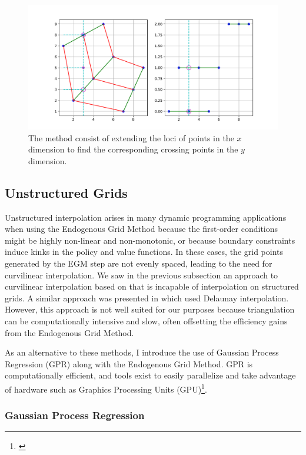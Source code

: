 \documentclass[\econtexRoot/SequentialEGM]{subfiles}
\begin{document}
\begin{figure}
  \centering
  \includegraphics[width=0.8\linewidth]{Figures/Mapping.pdf}
  \caption{The method consist of extending the loci of points in the $x$ dimension to find the corresponding crossing points in the $y$ dimension.}
  \notinsubfile{\label{fig:mapping}}
\end{figure}



\subsection{Unstructured Grids}

Unstructured interpolation arises in many dynamic programming applications when using the Endogenous Grid Method because the first-order conditions might be highly non-linear and non-monotonic, or because boundary constraints induce kinks in the policy and value functions. In these cases, the grid points generated by the EGM step are not evenly spaced, leading to the need for curvilinear interpolation. We saw in the previous subsection an approach to curvilinear interpolation based on \cite{White2015} that is incapable of interpolation on structured grids. A similar approach was presented in \cite{Ludwig2018} which used Delaunay interpolation. However, this approach is not well suited for our purposes because triangulation can be computationally intensive and slow, often offsetting the efficiency gains from the Endogenous Grid Method.

As an alternative to these methods, I introduce the use of Gaussian Process Regression (GPR) along with the Endogenous Grid Method. GPR is computationally efficient, and tools exist to easily parallelize and take advantage of hardware such as Graphics Processing Units (GPU)\footnote{\cite{Gardner2018}}.


\subsubsection{Gaussian Process Regression}
\end{document}
